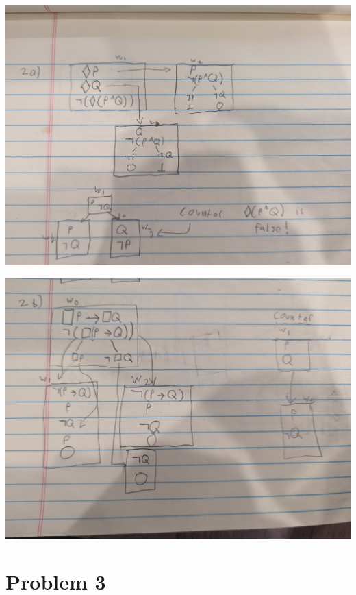 \documentclass[12pt]{article}
\begin{document}
\includegraphics[width=\textwidth]{2a}

\break

\includegraphics[width=\textwidth]{2b}

\section*{Problem 3}
\end{document}
